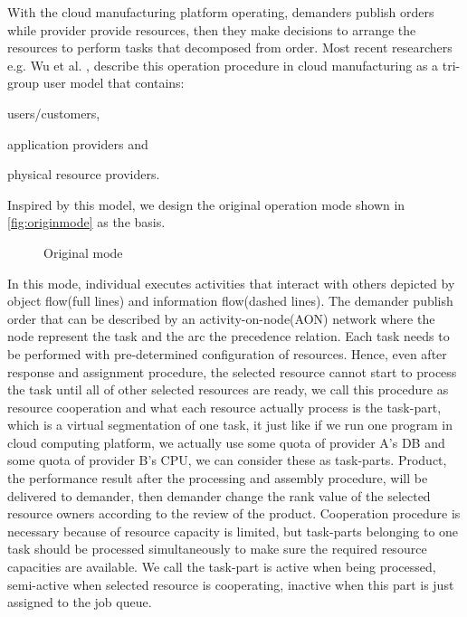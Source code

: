 With the cloud manufacturing platform operating, demanders publish orders while provider provide resources, then they make decisions to  arrange the resources to perform tasks that decomposed from order. Most recent researchers e.g. Wu et al. \cite{Wu2013}, describe this operation procedure in cloud manufacturing as a tri-group user model that contains:\begin{inparaenum}[1)]
\item users/customers,
\item application providers and
\item physical resource providers.
\end{inparaenum}
Inspired by this model, we design the original operation mode shown in \autoref{fig:originmode} as the basis.
\begin{figure}[htbp]
    \centering
    \resizebox{0.9\textwidth}{!}{}
    \caption{Original mode}
    \label{fig:originmode}
\end{figure}
In this mode, individual executes activities that interact with others depicted by object flow(full lines) and information flow(dashed lines). The demander publish order that can be described by an activity-on-node(AON) network where the node represent the task and the arc the precedence relation. Each task needs to be performed with pre-determined configuration of resources. Hence, even after response and assignment procedure, the selected resource cannot start to process the task until all of other selected resources are ready, we call this procedure as resource cooperation and what each resource actually process is the task-part, which is a virtual segmentation of one task, it just like if we run one program in cloud computing platform, we actually use some quota of provider A's DB and some quota of provider B's CPU, we can consider these as task-parts. Product, the performance result after the processing and assembly procedure, will be delivered to demander, then demander change the rank value of the selected resource owners according to the review of the product. Cooperation procedure is necessary because of resource capacity is limited, but task-parts belonging to one task should be processed simultaneously to make sure the required resource capacities are available. We call the task-part is active when being processed, semi-active when selected resource is cooperating, inactive when this part is just assigned to the job queue.

